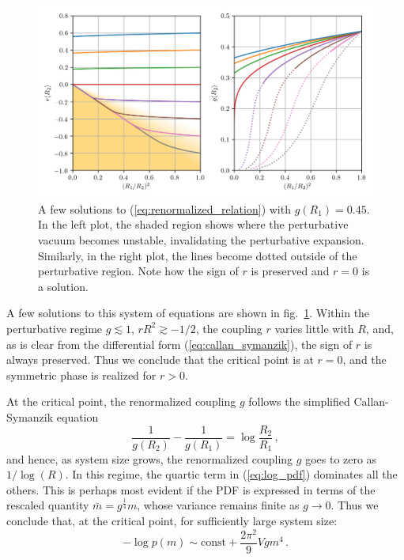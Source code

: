 \documentclass[11pt,a4paper]{article}
\begin{document}
\begin{figure}
\begin{center}
\includegraphics[scale=0.75]{renormalization_group.png}
\end{center}
    \caption{\label{fig:renormalization_group} A few solutions to
    (\ref{eq:renormalized_relation}) with $g(R_1) = 0.45$.  In the left plot,
    the shaded region shows where the perturbative vacuum becomes unstable,
    invalidating the perturbative expansion. Similarly, in the right plot, the
    lines become dotted outside of the perturbative region. Note how the sign
    of $r$ is preserved and $r = 0$ is a solution.}
\end{figure}

A few solutions to this system of equations are shown in
fig.~\ref{fig:renormalization_group}. Within the perturbative regime $g
\lesssim 1$, $r R^2 \gtrsim -1/2$, the coupling $r$ varies little with
$R$, and, as is clear from the differential form (\ref{eq:callan_symanzik}),
the sign of $r$ is always preserved. Thus we conclude that the critical point
is at $r = 0$, and the symmetric phase is realized for $r > 0$.

At the critical point, the renormalized coupling $g$ follows the simplified
Callan-Symanzik equation
\begin{equation}
    \frac{1}{g(R_2)} - \frac{1}{g(R_1)} = \log\frac{R_2}{R_1}\,,
\end{equation}
and hence, as system size grows, the renormalized coupling $g$ goes to zero as
$1 / \log(R)$.  In this regime, the quartic term in (\ref{eq:log_pdf})
dominates all the others. This is perhaps most evident if the PDF is expressed
in terms of the rescaled quantity $\bar{m} = g^{\frac{1}{4}} m$, whose variance
remains finite as $g\to0$. Thus we conclude that, at the critical point, for
sufficiently large system size:
\begin{equation}
    \label{eq:log_pdf_critical_point}
    -\log p(m) \sim \mathrm{const} + \frac{2\pi^2}{9} V gm^4\,.
\end{equation}
\end{document}
